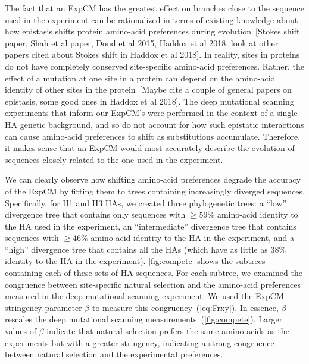 \documentclass[11pt]{article}
\newcommand\jdbcomment[1]{{\color{red}[#1]}}
\begin{document}
The fact that an ExpCM has the greatest effect on branches close to the sequence used in the experiment can be rationalized in terms of existing knowledge about how epistasis shifts protein amino-acid preferences during evolution~\jdbcomment{Stokes shift paper, Shah et al paper, Doud et al 2015, Haddox et al 2018, look at other papers cited about Stokes shift in Haddox et al 2018}.
In reality, sites in proteins do not have completely conserved site-specific amino-acid preferences. 
Rather, the effect of a mutation at one site in a protein can depend on the amino-acid identity of other sites in the protein~\jdbcomment{Maybe cite a couple of general papers on epistasis, some good ones in Haddox et al 2018}. 
The deep mutational scanning experiments that inform our ExpCM's were performed in the context of a single HA genetic background, and so do not account for how such epistatic interactions can cause amino-acid preferences to shift as substitutions accumulate. 
Therefore, it makes sense that an ExpCM would most accurately describe the evolution of sequences closely related to the one used in the experiment.
 
We can clearly observe how shifting amino-acid preferences degrade the accuracy of the ExpCM by fitting them to trees containing increasingly diverged sequences.
Specifically, for H1 and H3 HAs, we created three phylogenetic trees: a ``low'' divergence tree that contains only sequences with $\ge 59\%$ amino-acid identity to the HA used in the experiment, an ``intermediate'' divergence tree that contains sequences with $\ge 46\%$ amino-acid identity to the HA in the experiment, and a ``high'' divergence tree that contains all the HAs (which have as little as 38\% identity to the HA in the experiment).
\ref{fig:compete} shows the subtrees containing each of these sets of HA sequences.
For each subtree, we examined the congruence between site-specific natural selection and the amino-acid preferences measured in the deep mutational scanning experiment. 
We used the ExpCM stringency parameter $\beta$ to measure this congruency~(\ref{eq:Frxy}). 
In essence, $\beta$ rescales the deep mutational scanning measurements~(\ref{fig:compete}). 
Larger values of $\beta$ indicate that natural selection prefers the same amino acids as the experiments but with a greater stringency, indicating a strong congruence between natural selection and the experimental preferences. 
\end{document}
